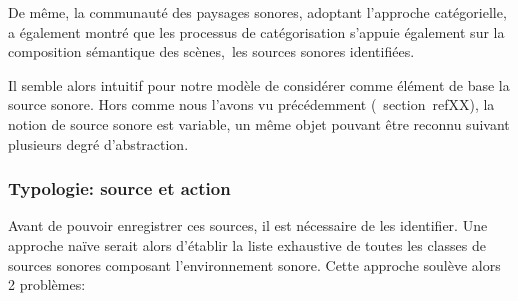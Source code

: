 
De même, la communauté des paysages sonores, adoptant l’approche catégorielle, a également montré que les processus de catégorisation s'appuie également sur la composition sémantique des scènes,\ie~les sources sonores identifiées.

Il semble alors intuitif pour notre modèle de considérer comme élément de base la source sonore. Hors comme nous l'avons vu précédemment (\cf~section~ref{XX}), la notion de source sonore est variable, un même objet pouvant être reconnu suivant plusieurs degré d'abstraction.

\subsubsection{Typologie: source et action}

Avant de pouvoir enregistrer ces sources, il est nécessaire de les identifier. Une approche naïve serait alors d'établir la liste exhaustive de toutes les classes de sources sonores composant l'environnement sonore. Cette approche soulève alors 2 problèmes:

